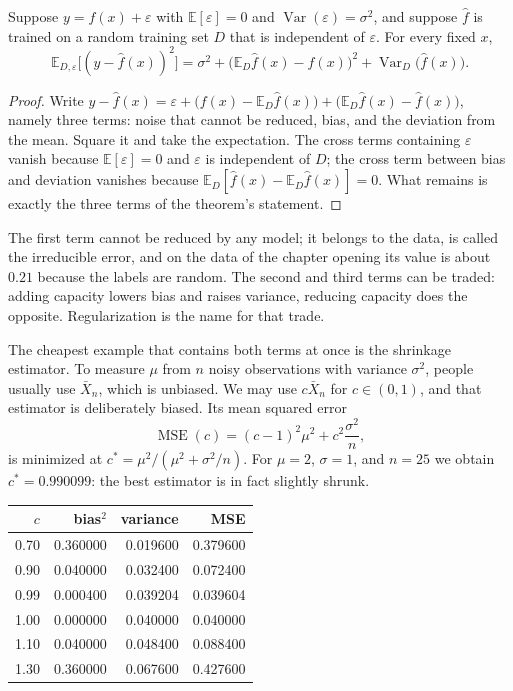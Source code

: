 
\begin{teorema}
Suppose $y=f(x)+\varepsilon$ with $\mathbb{E}[\varepsilon]=0$ and
$\operatorname{Var}(\varepsilon)=\sigma^2$, and suppose $\hat f$ is trained on a
random training set $D$ that is independent of $\varepsilon$. For every fixed $x$,
\[
\mathbb{E}_{D,\varepsilon}\bigl[(y-\hat f(x))^2\bigr]
=\sigma^2
+\bigl(\mathbb{E}_D\hat f(x)-f(x)\bigr)^2
+\operatorname{Var}_D\bigl(\hat f(x)\bigr).
\]
\end{teorema}

\begin{proof}[Proof]
Write $y-\hat f(x)=\varepsilon+\bigl(f(x)-\mathbb{E}_D\hat f(x)\bigr)
+\bigl(\mathbb{E}_D\hat f(x)-\hat f(x)\bigr)$, namely three terms: noise that cannot
be reduced, bias, and the deviation from the mean. Square it and take the
expectation. The cross terms containing $\varepsilon$ vanish because
$\mathbb{E}[\varepsilon]=0$ and $\varepsilon$ is independent of $D$; the cross term
between bias and deviation vanishes because
$\mathbb{E}_D[\hat f(x)-\mathbb{E}_D\hat f(x)]=0$. What remains is exactly the three
terms of the theorem's statement.
\end{proof}

The first term cannot be reduced by any model; it belongs to the data, is called
the irreducible error, and on the data of the chapter opening its value is about
$0.21$ because the labels are random. The second and third terms can be traded:
adding capacity lowers bias and raises variance, reducing capacity does the
opposite. Regularization is the name for that trade.

The cheapest example that contains both terms at once is the shrinkage estimator.
To measure $\mu$ from $n$ noisy observations with variance $\sigma^2$, people
usually use $\bar X_n$, which is unbiased. We may use $c\bar X_n$ for $c\in(0,1)$,
and that estimator is deliberately biased. Its mean squared error
\[
\operatorname{MSE}(c)=(c-1)^2\mu^2+c^2\frac{\sigma^2}{n},
\]
is minimized at $c^\ast=\mu^2/(\mu^2+\sigma^2/n)$. For $\mu=2$, $\sigma=1$, and
$n=25$ we obtain $c^\ast=0.990099$: the best estimator is in fact slightly shrunk.

\begin{center}
\small
\begin{tabular}{rrrr}
\hline
$c$ & bias$^2$ & variance & MSE \\
\hline
0.70 & 0.360000 & 0.019600 & 0.379600 \\
0.90 & 0.040000 & 0.032400 & 0.072400 \\
0.99 & 0.000400 & 0.039204 & 0.039604 \\
1.00 & 0.000000 & 0.040000 & 0.040000 \\
1.10 & 0.040000 & 0.048400 & 0.088400 \\
1.30 & 0.360000 & 0.067600 & 0.427600 \\
\hline
\end{tabular}
\end{center}

